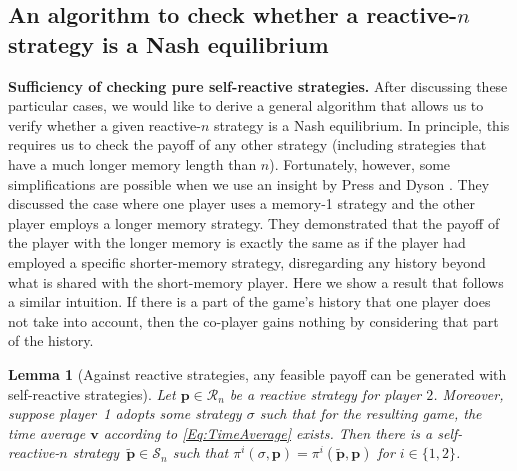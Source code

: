 \documentclass[9pt,twoside,lineno]{pnas-new}
\theoremstyle{plainCl1}
\newtheorem{lemma}{Lemma}
\theoremstyle{plainCl2}
\begin{document}

\subsection{An algorithm to check whether a reactive-$n$ strategy is a Nash equilibrium}
\label{Sec:Algorithm}

{\bf Sufficiency of checking pure self-reactive strategies.}
After discussing these particular cases, we would like to derive a general algorithm that allows us to verify whether a given reactive-$n$ strategy is a Nash equilibrium. 
In principle, this requires us to check the payoff of any other strategy (including strategies that have a much longer memory length than $n$). Fortunately, however, some simplifications are possible when we use an insight by Press and Dyson \cite{press:PNAS:2012}.
They discussed the case where one player uses a memory-1
strategy and the other player employs a longer memory strategy. They
demonstrated that the payoff of the player with the longer memory is exactly the
same as if the player had employed a specific shorter-memory strategy,
disregarding any history beyond what is shared with the short-memory player.
Here we show a result that follows a similar intuition. 
If there is a part of the game's history that one player does not take into account, then the co-player gains nothing by
considering that part of the history. 

\begin{lemma}[Against reactive strategies, any feasible payoff can be generated with self-reactive strategies] \label{lemma:self_reactive_sufficiency}
 Let $\mathbf{p}\!\in\!\mathcal{R}_n$ be a reactive strategy for player $2$. 
 Moreover, suppose player~1 adopts some strategy $\sigma$ such that for the resulting game, the time average $\mathbf{v}$ according to \eqref{Eq:TimeAverage} exists. 
 Then there is a self-reactive-$n$ strategy~$\mathbf{\tilde p}\!\in\!\mathcal{S}_n$ such that $\pi^i(\sigma, \mathbf{p})\! = \!\pi^i(\mathbf{\tilde{p}}, \mathbf{p})$ for $i\!\in\!\{1,2\}$.
\end{lemma}
\end{document}
